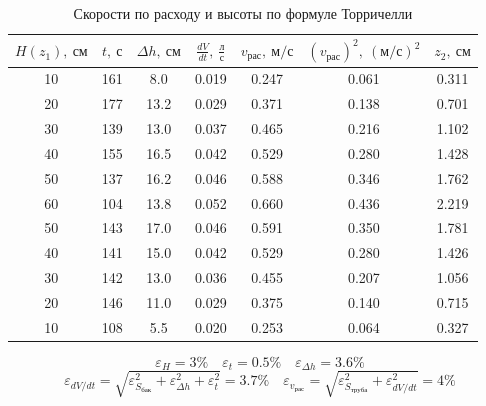 \documentclass[a4paper, 12pt]{article}
\begin{document}
  \begin{table}[h!]
       
        \begin{center}
         \begin{tabular}{|c|c|c|c|c|c|c|}
            \hline
 $H (z_1), \: см$ & $t, \: с$ & $\Delta h, \: см$ & $\frac{dV}{dt}, \: \frac{л}{с} $  & $v_{рас}, \: м/с$ & $(v_{рас})^2, \: (м/с)^2$ & $z_2, \: см$ \\
 \hline
 10 & 161 & 8.0 & 0.019 & 0.247 & 0.061 & 0.311 \\
\hline
 20 & 177 & 13.2 & 0.029 & 0.371 & 0.138 & 0.701 \\
\hline
 30 & 139 & 13.0 & 0.037 & 0.465 & 0.216 & 1.102 \\
\hline
 40 & 155 & 16.5 & 0.042 & 0.529 & 0.280 & 1.428 \\
\hline
 50 & 137 & 16.2 & 0.046 & 0.588 & 0.346 & 1.762 \\
\hline
 60 & 104 & 13.8 & 0.052 & 0.660 & 0.436 & 2.219 \\
\hline
 50 & 143 & 17.0 & 0.046 & 0.591 & 0.350 & 1.781 \\
\hline
 40 & 141 & 15.0 & 0.042 & 0.529 & 0.280 & 1.426 \\
\hline
 30 & 142 & 13.0 & 0.036 & 0.455 & 0.207 & 1.056 \\
\hline
 20 & 146 & 11.0 & 0.029 & 0.375 & 0.140 & 0.715 \\
\hline
 10 & 108 & 5.5 & 0.020 & 0.253 & 0.064 & 0.327 \\
\hline
 \end{tabular}
\[ \varepsilon_H = 3 \% \quad \varepsilon_t = 0.5 \% \quad \varepsilon_{\Delta h} = 3.6 \%\] 
\[ \varepsilon_{dV/dt} = \sqrt{\varepsilon_{S_{бак}}^2 + \varepsilon_{\Delta h}^2 + \varepsilon_{t}^2} = 3.7 \% \quad \varepsilon_{v_{рас}} = \sqrt{\varepsilon_{S_{труба}}^2 + \varepsilon_{dV/dt}^2} = 4 \%\]
\end{center}        
         \caption{Скорости по расходу и высоты по формуле Торричелли}
\end{table}
\end{document}
